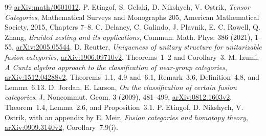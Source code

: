 \documentclass[11pt]{article}
\begin{document}
\begin{thebibliography}{99}
\href{https://arxiv.org/abs/math/0601012}{arXiv:math/0601012}.
 P. Etingof, S. Gelaki, D. Nikshych, V. Ostrik,
\emph{Tensor Categories}, Mathematical Surveys and Monographs 205,
American Mathematical Society, 2015, Chapters 7--8.
 C. Delaney, C. Galindo, J. Plavnik, E. C. Rowell, Q. Zhang,
\emph{Braided zesting and its applications}, Commun. Math. Phys. 386
(2021), 1--55, \href{https://arxiv.org/abs/2005.05544}{arXiv:2005.05544}.
 D. Reutter, \emph{Uniqueness of unitary structure for
unitarizable fusion categories},
\href{https://arxiv.org/abs/1906.09710v2}{arXiv:1906.09710v2},
Theorems~1--2 and Corollary~3.
 M. Izumi, \emph{A Cuntz algebra approach to the
classification of near-group categories},
\href{https://arxiv.org/abs/1512.04288v2}{arXiv:1512.04288v2},
Theorems~1.1, 4.9 and~6.1, Remark~3.6, Definition~4.8, and Lemma~6.13.
 D. Jordan, E. Larson, \emph{On the classification
of certain fusion categories}, J. Noncommut. Geom. 3 (2009), 481--499,
\href{https://arxiv.org/abs/0812.1603v2}{arXiv:0812.1603v2},
Theorem~1.4, Lemma~2.6, and Proposition~3.1.
 P. Etingof, D. Nikshych, V. Ostrik,
with an appendix by E. Meir, \emph{Fusion categories and homotopy theory},
\href{https://arxiv.org/abs/0909.3140v2}{arXiv:0909.3140v2},
Corollary~7.9(i).
\end{thebibliography}
\end{document}

